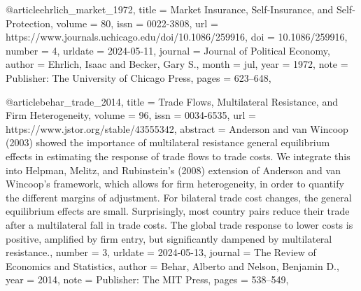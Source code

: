 {{{{@article{ehrlich_market_1972,
	title = {Market {Insurance}, {Self}-{Insurance}, and {Self}-{Protection}},
	volume = {80},
	issn = {0022-3808},
	url = {https://www.journals.uchicago.edu/doi/10.1086/259916},
	doi = {10.1086/259916},
	number = {4},
	urldate = {2024-05-11},
	journal = {Journal of Political Economy},
	author = {Ehrlich, Isaac and Becker, Gary S.},
	month = jul,
	year = {1972},
	note = {Publisher: The University of Chicago Press},
	pages = {623--648},
}

@article{behar_trade_2014,
	title = {Trade {Flows}, {Multilateral} {Resistance}, and {Firm} {Heterogeneity}},
	volume = {96},
	issn = {0034-6535},
	url = {https://www.jstor.org/stable/43555342},
	abstract = {Anderson and van Wincoop (2003) showed the importance of multilateral resistance general equilibrium effects in estimating the response of trade flows to trade costs. We integrate this into Helpman, Melitz, and Rubinstein's (2008) extension of Anderson and van Wincoop's framework, which allows for firm heterogeneity, in order to quantify the different margins of adjustment. For bilateral trade cost changes, the general equilibrium effects are small. Surprisingly, most country pairs reduce their trade after a multilateral fall in trade costs. The global trade response to lower costs is positive, amplified by firm entry, but significantly dampened by multilateral resistance.},
	number = {3},
	urldate = {2024-05-13},
	journal = {The Review of Economics and Statistics},
	author = {Behar, Alberto and Nelson, Benjamin D.},
	year = {2014},
	note = {Publisher: The MIT Press},
	pages = {538--549},
}

}}}}
